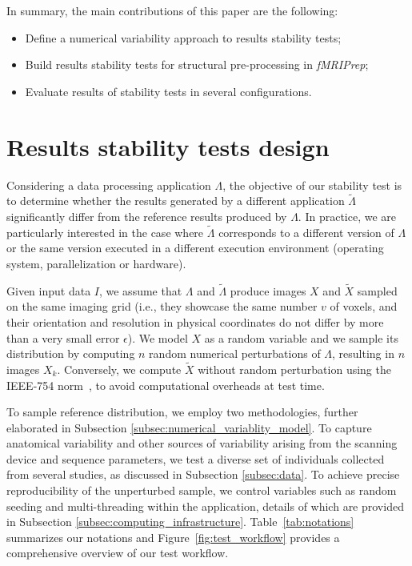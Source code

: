 \documentclass[lettersize,journal]{IEEEtran}
\newcommand{\fmriprep}{\emph{fMRIPrep}\xspace}
\begin{document}
{In summary, the main contributions of this paper are the following:
\begin{itemize}
  \item Define a numerical variability approach to results stability tests;
  \item Build results stability tests for structural pre-processing in \fmriprep;
  \item Evaluate results of stability tests in several configurations.
\end{itemize}

\section{Results stability tests design}

Considering a data processing application $\Lambda$, the objective of our stability test is to determine whether the results generated by a different application $\tilde \Lambda$ significantly differ from the reference results produced by $\Lambda$. In practice, we are particularly interested in the case where $\tilde \Lambda$ corresponds to a different version of $\Lambda$ or the same version executed in a different execution environment (operating system, parallelization or hardware).

Given input data $I$, we assume that $\Lambda$ and $\tilde \Lambda$ produce images $X$ and $\tilde X$ sampled on the same imaging grid (i.e., they showcase the same number $v$ of voxels, and their orientation and resolution in physical coordinates do not differ by more than a very small error $\epsilon$).
We model $X$ as a random variable and we sample its distribution by computing $n$ random numerical perturbations of $\Lambda$, resulting in $n$ images $X_k$. Conversely, we compute $\tilde X$ without random perturbation using the IEEE-754 norm~\cite{ieee754}, to avoid computational overheads at test time.


To sample reference distribution, we employ two methodologies, further elaborated in Subsection \ref{subsec:numerical_variablity_model}.
To capture anatomical variability and other sources of variability arising from the scanning device and sequence parameters, we test a diverse set of individuals collected from several studies, as discussed in Subsection \ref{subsec:data}.
To achieve precise reproducibility of the unperturbed sample, we control variables such as random seeding and multi-threading within the application, details of which are provided in Subsection \ref{subsec:computing_infrastructure}.
Table~\ref{tab:notations} summarizes our notations and Figure~\ref{fig:test_workflow} provides a comprehensive overview of our test workflow.


}
\end{document}
